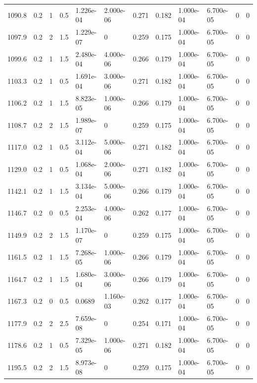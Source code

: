 \documentclass[preview]{standalone}
\begin{document}
{{{\begin{tabular}{L{1.2cm}C{1.2cm} C{0.3cm}C{0.5cm} C{1.4cm}C{1.4cm} C{1.4cm}C{1.4cm} C{1.6cm}C{1.6cm} C{1.6cm}C{1.6cm}}
  1090.8  &   0.2  & 1     & 0.5 &  1.226e-04  & 2.000e-06  &  0.271&   0.182& 1.000e-04 & 6.700e-05   &  0 & 0  \\ 
  1097.9  &   0.2  & 2     & 1.5 &  1.229e-07  & 0  &  0.259&   0.175& 1.000e-04 & 6.700e-05   &  0 & 0  \\ 
  1099.6  &   0.2  & 1     & 1.5 &  2.480e-04  & 4.000e-06  &  0.266&   0.179& 1.000e-04 & 6.700e-05   &  0 & 0  \\ 
  1103.3  &   0.2  & 1     & 0.5 &  1.691e-04  & 3.000e-06  &  0.271&   0.182& 1.000e-04 & 6.700e-05   &  0 & 0  \\ 
  1106.2  &   0.2  & 1     & 1.5 &  8.823e-05  & 1.000e-06  &  0.266&   0.179& 1.000e-04 & 6.700e-05   &  0 & 0  \\ 
  1108.7  &   0.2  & 2     & 1.5 &  1.989e-07  & 0  &  0.259&   0.175& 1.000e-04 & 6.700e-05   &  0 & 0  \\ 
  1117.0  &   0.2  & 1     & 0.5 &  3.112e-04  & 5.000e-06  &  0.271&   0.182& 1.000e-04 & 6.700e-05   &  0 & 0  \\ 
  1129.0  &   0.2  & 1     & 0.5 &  1.068e-04  & 2.000e-06  &  0.271&   0.182& 1.000e-04 & 6.700e-05   &  0 & 0  \\ 
  1142.1  &   0.2  & 1     & 1.5 &  3.134e-04  & 5.000e-06  &  0.266&   0.179& 1.000e-04 & 6.700e-05   &  0 & 0  \\ 
  1146.7  &   0.2  & 0     & 0.5 &  2.253e-04  & 4.000e-06  &  0.262&   0.177& 1.000e-04 & 6.700e-05   &  0 & 0  \\ 
  1149.9  &   0.2  & 2     & 1.5 &  1.170e-07  & 0  &  0.259&   0.175& 1.000e-04 & 6.700e-05   &  0 & 0  \\ 
  1161.5  &   0.2  & 1     & 1.5 &  7.268e-05  & 1.000e-06  &  0.266&   0.179& 1.000e-04 & 6.700e-05   &  0 & 0  \\ 
  1164.7  &   0.2  & 1     & 1.5 &  1.680e-04  & 3.000e-06  &  0.266&   0.179& 1.000e-04 & 6.700e-05   &  0 & 0  \\ 
  1167.3  &   0.2  & 0     & 0.5 &  0.0689  & 1.160e-03  &  0.262&   0.177& 1.000e-04 & 6.700e-05   &  0 & 0  \\ 
  1177.9  &   0.2  & 2     & 2.5 &  7.659e-08  & 0  &  0.254&   0.171& 1.000e-04 & 6.700e-05   &  0 & 0  \\ 
  1178.6  &   0.2  & 1     & 0.5 &  7.329e-05  & 1.000e-06  &  0.271&   0.182& 1.000e-04 & 6.700e-05   &  0 & 0  \\ 
  1195.5  &   0.2  & 2     & 1.5 &  8.973e-08  & 0  &  0.259&   0.175& 1.000e-04 & 6.700e-05   &  0 & 0  \\ 

\end{tabular}}}}
\end{document}

